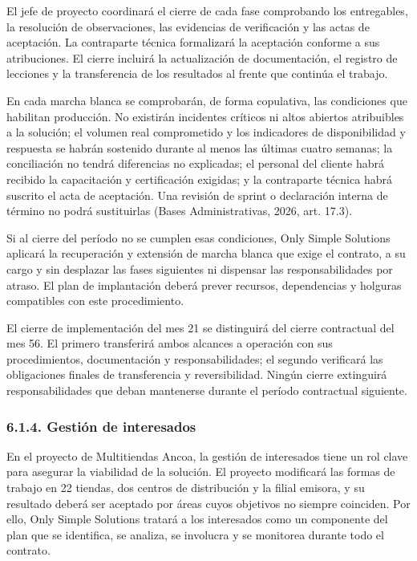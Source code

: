 \documentclass[11pt]{article}
\begin{document}
El jefe de proyecto coordinará el cierre de cada fase comprobando los entregables, la resolución de observaciones, las evidencias de verificación y las actas de aceptación. La contraparte técnica formalizará la aceptación conforme a sus atribuciones. El cierre incluirá la actualización de documentación, el registro de lecciones y la transferencia de los resultados al frente que continúa el trabajo.

En cada marcha blanca se comprobarán, de forma copulativa, las
condiciones que habilitan producción. No existirán incidentes críticos
ni altos abiertos atribuibles a la solución; el volumen real
comprometido y los indicadores de disponibilidad y respuesta se habrán
sostenido durante al menos las últimas cuatro semanas; la conciliación
no tendrá diferencias no explicadas; el personal del cliente habrá
recibido la capacitación y certificación exigidas; y la contraparte
técnica habrá suscrito el acta de aceptación. Una revisión de sprint o
declaración interna de término no podrá sustituirlas (Bases
Administrativas, 2026, art. 17.3).

Si al cierre del período no se cumplen esas condiciones, Only Simple
Solutions aplicará la recuperación y extensión de marcha blanca que
exige el contrato, a su cargo y sin desplazar las fases siguientes ni
dispensar las responsabilidades por atraso. El plan de implantación
deberá prever recursos, dependencias y holguras compatibles con este
procedimiento.

El cierre de implementación del mes 21 se distinguirá del cierre
contractual del mes 56. El primero transferirá ambos alcances a
operación con sus procedimientos, documentación y responsabilidades; el
segundo verificará las obligaciones finales de transferencia y
reversibilidad. Ningún cierre extinguirá responsabilidades que deban
mantenerse durante el período contractual siguiente.

\subsubsection{6.1.4. Gestión de interesados}\label{6-1-4-gestion-de-interesados}

En el proyecto de Multitiendas Ancoa, la gestión de interesados tiene un rol clave para asegurar la viabilidad de la solución. El proyecto modificará las formas de trabajo en 22 tiendas, dos centros de distribución y la filial emisora, y su resultado deberá ser aceptado por áreas cuyos objetivos no siempre coinciden. Por ello, Only Simple Solutions tratará a los interesados como un componente del plan que se identifica, se analiza, se involucra y se monitorea durante todo el contrato.
\end{document}
